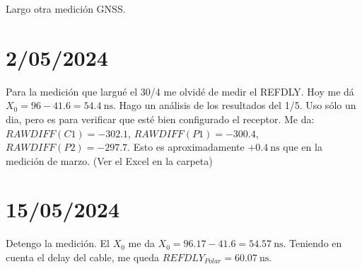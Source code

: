 \documentclass[11pt]{article}
\begin{document}
Largo otra medición GNSS. 

\section{2/05/2024}
Para la medición que largué el 30/4 me olvidé de medir el REFDLY. Hoy me dá $X_0= 96 - 41.6= \SI{54.4}{\nano\second}$. Hago un análisis de los resultados del 1/5. Uso sólo un dia, pero es para verificar que esté bien configurado el receptor. Me da: $RAWDIFF(C1) = -302.1$, $RAWDIFF(P1) = -300.4$, $RAWDIFF(P2) = -297.7$. Esto es aproximadamente $+\SI{0.4}{\nano\second}$ que en la medición de marzo. (Ver el Excel en la carpeta)  

\section{15/05/2024}
Detengo la medición. El $X_0$ me da $X_0= 96.17 -41.6 = \SI{54.57}{\nano\second}$. Teniendo en cuenta el delay del cable, me queda $REFDLY_{Polar}= \SI{60.07}{\nano\second}$.




\newpage
\printbibliography[title= Referencias, heading=bibintoc]
\end{document}
